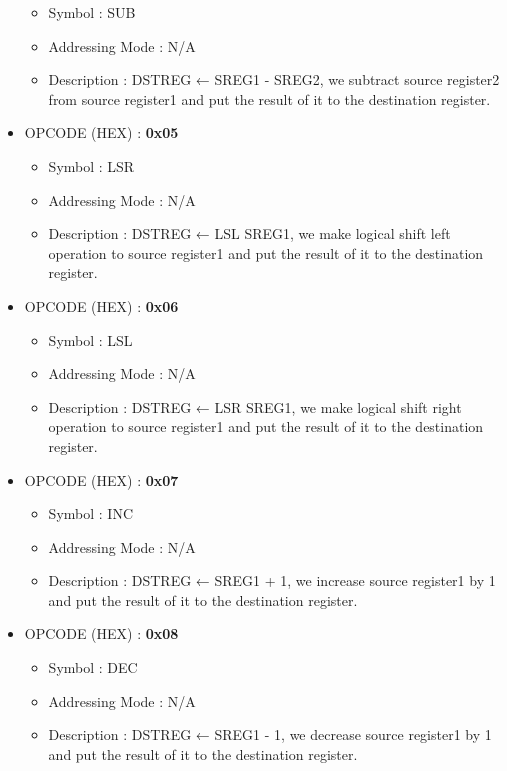 \documentclass[pdftex,12pt,a4paper]{article}
\begin{document}
\begin{itemize}
\begin{itemize}
            \item Symbol : SUB
            \item Addressing Mode : N/A
            \item Description : DSTREG ← SREG1 - SREG2, we subtract source register2 from source register1 and put the result of it to  the destination register.
        \end{itemize}    
    \item OPCODE (HEX) : \textbf{0x05} 
        \begin{itemize}
            \item Symbol : LSR
            \item Addressing Mode : N/A
            \item Description : DSTREG ← LSL SREG1, we make logical shift left operation to source register1 and put the result of it to  the destination register.
        \end{itemize}    
    \item OPCODE (HEX) : \textbf{0x06}
        \begin{itemize}
            \item Symbol : LSL
            \item Addressing Mode : N/A
            \item Description : DSTREG ← LSR SREG1, we make logical shift right operation to source register1 and put the result of it to  the destination register.
        \end{itemize}
    \item OPCODE (HEX) : \textbf{0x07}
        \begin{itemize}
            \item Symbol : INC
            \item Addressing Mode : N/A
            \item Description : DSTREG ← SREG1 + 1, we increase source register1 by 1 and put the result of it to  the destination register.
        \end{itemize}    
    \item OPCODE (HEX) : \textbf{0x08}
        \begin{itemize}
            \item Symbol : DEC
            \item Addressing Mode : N/A
            \item Description : DSTREG ← SREG1 - 1, we decrease source register1 by 1 and put the result of it to  the destination register.
        \end{itemize}    

\end{itemize}
\end{document}
